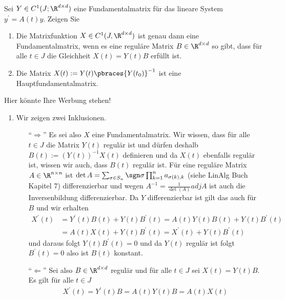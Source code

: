 \begin{exercise}
    Sei $Y \in C^1(J; \R^{d \times d})$ eine Fundamentalmatrix für das lineare System $y^\prime = A(t) y$. Zeigen Sie
    \begin{enumerate}[label = \alph*)]
        \item Die Matrixfunktion $X \in C^1(J, \R^{d \times d})$ ist genau dann eine Fundamentalmatrix, wenn es eine reguläre Matrix $B \in \R^{d \times d}$ so gibt, dass für alle $t \in J$ die Gleichheit $X(t) = Y(t)B$ erfüllt ist.
        \item Die Matrix $X(t) := Y(t) \pbraces{Y(t_0)}^{-1}$ ist eine Hauptfundamentalmatrix.
    \end{enumerate}
\end{exercise}

\begin{solution}
    Hier könnte Ihre Werbung stehen!
    \begin{enumerate}[label = \alph*)]
        \item \label{fundam} Wir zeigen zwei Inklusionen.
        \begin{enumerate}
            \item[``$\Rightarrow$''] Es sei also $X$ eine Fundamentalmatrix. Wir wissen, dass für alle $t \in J$ die Matrix $Y(t)$ regulär ist und dürfen deshalb $B(t) := (Y(t))^{-1} X(t) $ definieren und da $X(t)$ ebenfalls regulär ist, wissen wir auch, dass $B(t)$ regulär ist. Für eine reguläre Matrix $A \in \R^{n \times n}$ ist $\det A = \sum_{\sigma \in S_n} \sgn \sigma \prod_{k = 1}^n a_{\sigma(k), k}$ (siehe LinAlg Buch Kapitel 7) differenzierbar und wegen $A^{-1} = \frac{1}{\det(A)} adj A$ ist auch die Inversenbildung differenzierbar. Da $Y$ differenzierbar ist gilt das auch für $B$ und wir erhalten
            \begin{align*}
                X^\prime(t) &= Y^\prime(t) B(t) + Y(t) B^\prime(t) = A(t) Y(t) B(t) + Y(t) B^\prime(t) \\
                &= A(t) X(t) + Y(t) B^\prime(t) = X^\prime(t) + Y(t) B^\prime(t)
            \end{align*} 
            und daraus folgt $Y(t) B^\prime(t) = 0$ und da $Y(t)$ regulär ist folgt $B^\prime(t) = 0$ also ist $B(t)$ konstant.
            \item[``$\Leftarrow$''] Sei also $B \in \R^{d \times d}$ regulär und für alle $t \in J$ sei $X(t) = Y(t)B$. Es gilt für alle $t \in J$
            \begin{align*}
                X^\prime(t) = Y^\prime(t) B = A(t) Y(t) B = A(t) X(t)

\end{align*}
\end{enumerate}
\end{enumerate}
\end{solution}
